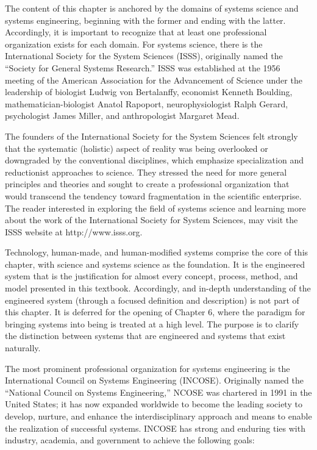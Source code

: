 The content of this chapter is anchored by the domains of systems science and systems engineering, beginning with the former and ending with the latter. Accordingly, it is important to recognize that at least one professional organization exists for each domain. For systems science, there is the International Society for the System Sciences (ISSS), originally named the ``Society for General Systems Research.'' ISSS was established at the 1956 meeting of the American Association for the Advancement of Science under the leadership of biologist Ludwig von Bertalanffy, economist Kenneth Boulding, mathematician-biologist Anatol Rapoport, neurophysiologist Ralph Gerard, psychologist James Miller, and anthropologist Margaret Mead.

The founders of the International Society for the System Sciences felt strongly that the systematic (holistic) aspect of reality was being overlooked or downgraded by the conventional disciplines, which emphasize specialization and reductionist approaches to science. They stressed the need for more general principles and theories and sought to create a professional organization that would transcend the tendency toward fragmentation in the scientific enterprise. The reader interested in exploring the field of systems science and learning more about the work of the International Society for System Sciences, may visit the ISSS website at http://www.isss.org.

Technology, human-made, and human-modified systems comprise the core of this chapter, with science and systems science as the foundation. It is the engineered system that is the justification for almost every concept, process, method, and model presented in this textbook. Accordingly, and in-depth understanding of the engineered system (through a focused definition and description) is not part of this chapter. It is deferred for the opening of Chapter 6, where the paradigm for bringing systems into being is treated at a high level. The purpose is to clarify the distinction between systems that are engineered and systems that exist naturally.

The most prominent professional organization for systems engineering is the International Council on Systems Engineering (INCOSE). Originally named the ``National Council on Systems Engineering,'' NCOSE was chartered in 1991 in the United States; it has now expanded worldwide to become the leading society to develop, nurture, and enhance the interdisciplinary approach and means to enable the realization of successful systems. INCOSE has strong and enduring ties with industry, academia, and government to achieve the following goals:

